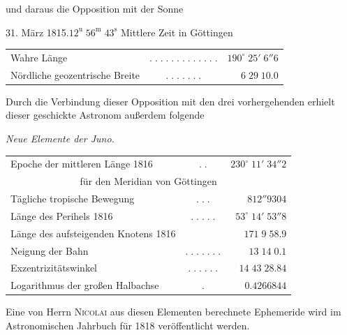 \noindent und daraus die Opposition mit der Sonne

\begin{center}31. März 1815.\quad $12^{\mathrm u}\;56^{\mathrm m}\;43^{\mathrm s}$ Mittlere Zeit in Göttingen\end{center}
\begin{center}\fontsize{9}{11}\selectfont\setlength{\tabcolsep}{2pt}\renewcommand{\arraystretch}{1.15}\begin{tabular}{lcr}
Wahre Länge & $.\;.\;.\;.\;.\;.\;.\;.\;.\;.\;.\;.\;.$ & $190^\circ\;25'\;6''6$\\
Nördliche geozentrische Breite & $.\;.\;.\;.\;.\;.\;.$ & $6\;29\;10.0$\\
\end{tabular}\end{center}

\par\indent Durch die Verbindung dieser Opposition mit den drei vorhergehenden erhielt dieser geschickte Astronom außerdem folgende

\begin{center}
\emph{Neue Elemente der Juno.}
\end{center}

\begin{center}\fontsize{9}{11}\selectfont\setlength{\tabcolsep}{2pt}\renewcommand{\arraystretch}{1.15}\begin{tabular}{lcr}
Epoche der mittleren Länge 1816 & $.\;.$ & $230^\circ\;11'\;34''2$\\
\multicolumn{3}{c}{für den Meridian von Göttingen}\\
Tägliche tropische Bewegung & $.\;.\;.$ & $812''9304$\\
Länge des Perihels 1816 & $.\;.\;.\;.\;.$ & $53^\circ\;14'\;53''8$\\
Länge des aufsteigenden Knotens 1816 &  & $171\;9\;58.9$\\
Neigung der Bahn & $.\;.\;.\;.\;.\;.\;.$ & $13\;14\;0.1$\\
Exzentrizitätswinkel & $.\;.\;.\;.\;.\;.$ & $14\;43\;28.84$\\
Logarithmus der großen Halbachse & $.$ & $0.4266844$\\
\end{tabular}\end{center}

\par\indent Eine von Herrn \textsc{Nicolai} aus diesen Elementen berechnete Ephemeride wird im Astronomischen Jahrbuch für 1818 veröffentlicht werden.
